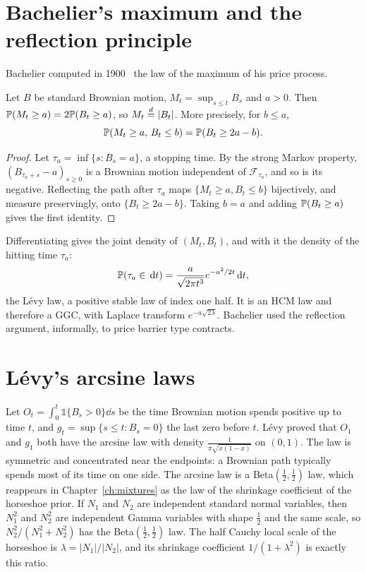 \section{Bachelier's maximum and the reflection principle}

Bachelier computed in 1900~\cite{bachelier1900} the law of the maximum of his price process.

\begin{theorem}
\label{thm:reflection}
Let $B$ be standard Brownian motion, $M_t = \sup_{s\leq t}B_s$ and $a>0$. Then $\P(M_t\geq a) = 2\P(B_t\geq a)$, so $M_t\eqd|B_t|$. More precisely, for $b\leq a$,
\[
\P(M_t\geq a,\,B_t\leq b) = \P(B_t\geq2a-b).
\]
\end{theorem}

\begin{proof}
Let $\tau_a = \inf\{s:B_s = a\}$, a stopping time. By the strong Markov property, $(B_{\tau_a+s}-a)_{s\geq0}$ is a Brownian motion independent of $\mathcal{F}_{\tau_a}$, and so is its negative. Reflecting the path after $\tau_a$ maps $\{M_t\geq a,B_t\leq b\}$ bijectively, and measure preservingly, onto $\{B_t\geq2a-b\}$. Taking $b = a$ and adding $\P(B_t\geq a)$ gives the first identity.
\end{proof}

Differentiating gives the joint density of $(M_t,B_t)$, and with it the density of the hitting time $\tau_a$:
\[
\P(\tau_a\in\dd t) = \frac{a}{\sqrt{2\pi t^3}}e^{-a^2/2t}\dd t,
\]
the L\'evy law, a positive stable law of index one half. It is an HCM law and therefore a GGC, with Laplace transform $e^{-a\sqrt{2\lambda}}$. Bachelier used the reflection argument, informally, to price barrier type contracts.

\section{L\'evy's arcsine laws}

Let $O_t = \int_0^t\mathbb{1}\{B_s>0\}\dd s$ be the time Brownian motion spends positive up to time $t$, and $g_t = \sup\{s\leq t:B_s = 0\}$ the last zero before $t$. L\'evy proved that $O_1$ and $g_1$ both have the arcsine law with density $\frac{1}{\pi\sqrt{x(1-x)}}$ on $(0,1)$. The law is symmetric and concentrated near the endpoints: a Brownian path typically spends most of its time on one side. The arcsine law is a Beta$(\frac12,\frac12)$ law, which reappears in Chapter~\ref{ch:mixtures} as the law of the shrinkage coefficient of the horseshoe prior. If $N_1$ and $N_2$ are independent standard normal variables, then $N_1^2$ and $N_2^2$ are independent Gamma variables with shape $\frac12$ and the same scale, so $N_2^2/(N_1^2+N_2^2)$ has the Beta$(\frac12,\frac12)$ law. The half Cauchy local scale of the horseshoe is $\lambda = |N_1|/|N_2|$, and its shrinkage coefficient $1/(1+\lambda^2)$ is exactly this ratio.

